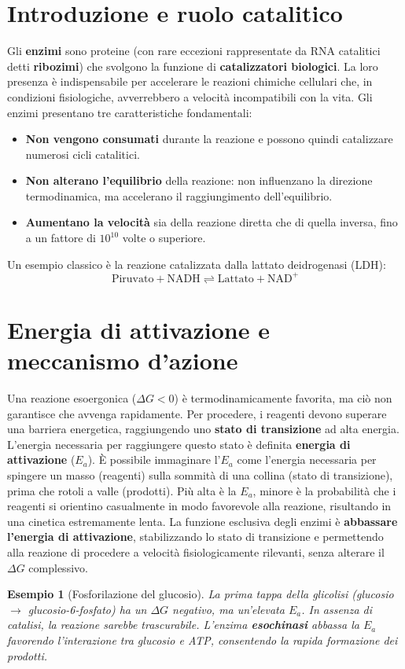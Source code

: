 \documentclass[12pt,a4paper]{report}
\newtheorem{esempio}{Esempio}[section]
\begin{document}
\section{Introduzione e ruolo catalitico}
Gli \textbf{enzimi} sono proteine (con rare eccezioni rappresentate da RNA catalitici detti \textbf{ribozimi}) che svolgono la funzione di \textbf{catalizzatori biologici}. La loro presenza è indispensabile per accelerare le reazioni chimiche cellulari che, in condizioni fisiologiche, avverrebbero a velocità incompatibili con la vita.
Gli enzimi presentano tre caratteristiche fondamentali:
\begin{itemize}
\item \textbf{Non vengono consumati} durante la reazione e possono quindi catalizzare numerosi cicli catalitici.
\item \textbf{Non alterano l'equilibrio} della reazione: non influenzano la direzione termodinamica, ma accelerano il raggiungimento dell'equilibrio.
\item \textbf{Aumentano la velocità} sia della reazione diretta che di quella inversa, fino a un fattore di \(10^{10}\) volte o superiore.
\end{itemize}
Un esempio classico è la reazione catalizzata dalla lattato deidrogenasi (LDH):
\[
\text{Piruvato} + \text{NADH} \rightleftharpoons \text{Lattato} + \text{NAD}^+
\]

\section{Energia di attivazione e meccanismo d'azione}
Una reazione esoergonica (\(\Delta G < 0\)) è termodinamicamente favorita, ma ciò non garantisce che avvenga rapidamente. Per procedere, i reagenti devono superare una barriera energetica, raggiungendo uno \textbf{stato di transizione} ad alta energia. L'energia necessaria per raggiungere questo stato è definita \textbf{energia di attivazione} (\(E_a\)).
È possibile immaginare l'\(E_a\) come l'energia necessaria per spingere un masso (reagenti) sulla sommità di una collina (stato di transizione), prima che rotoli a valle (prodotti). Più alta è la \(E_a\), minore è la probabilità che i reagenti si orientino casualmente in modo favorevole alla reazione, risultando in una cinetica estremamente lenta.
La funzione esclusiva degli enzimi è \textbf{abbassare l'energia di attivazione}, stabilizzando lo stato di transizione e permettendo alla reazione di procedere a velocità fisiologicamente rilevanti, senza alterare il \(\Delta G\) complessivo.
\begin{esempio}[Fosforilazione del glucosio]
La prima tappa della glicolisi (glucosio \(\rightarrow\) glucosio-6-fosfato) ha un \(\Delta G\) negativo, ma un'elevata \(E_a\). In assenza di catalisi, la reazione sarebbe trascurabile. L'enzima \textbf{esochinasi} abbassa la \(E_a\) favorendo l'interazione tra glucosio e ATP, consentendo la rapida formazione dei prodotti.
\end{esempio}
\end{document}
